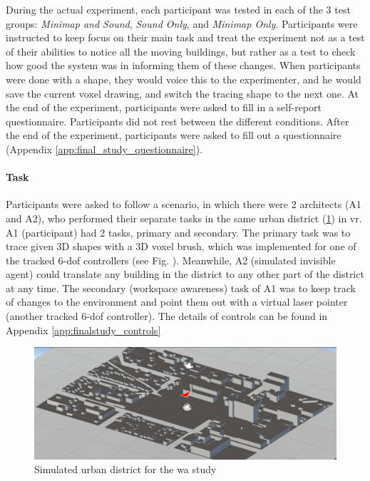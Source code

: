 During the actual experiment, each participant was tested in each of the 3 test groups: \textit{Minimap and Sound}, \textit{Sound Only}, and \textit{Minimap Only}. Participants were instructed to keep focus on their main task and treat the experiment not as a test of their abilities to notice all the moving buildings, but rather as a test to check how good the system was in informing them of these changes. 
When participants were done with a shape, they would voice this to the experimenter, and he would save the current voxel drawing, and switch the tracing shape to the next one.
At the end of the experiment, participants were asked to fill in a self-report questionnaire.
Participants did not rest between the different conditions. 
After the end of the experiment, participants were asked to fill out a questionnaire (Appendix \ref{app:final_study_questionnaire}).

\paragraph{Task}
Participants were asked to follow a scenario, in which there were 2 architects (A1 and A2), who performed their separate tasks in the same urban district (\ref{fig:urbandistrict}) in \gls{vr}. A1 (participant) had 2 tasks, primary and secondary. The primary task was to trace given 3D shapes with a 3D voxel brush, which was implemented for one of the tracked 6-\gls{dof} controllers (see Fig. ). Meanwhile, A2 (simulated invisible agent) could translate any building in the district to any other part of the district at any time. The secondary (workspace awareness) task of A1 was to keep track of changes to the environment and point them out with a virtual laser pointer (another tracked 6-\gls{dof} controller). The details of controls can be found in Appendix \ref{app:finalstudy_controls}

\begin{figure}
	\centering
	\includegraphics[width=0.7\linewidth]{figures/urban_district}
	\caption{Simulated urban district for the \gls{wa} study}
	\label{fig:urbandistrict}
\end{figure}


